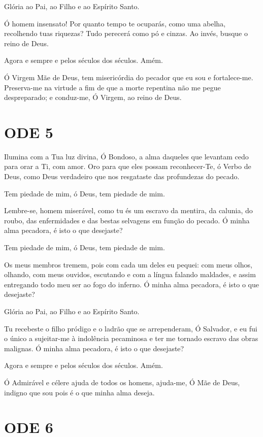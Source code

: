 \documentclass{subfiles}
\begin{document}
Glória ao Pai, ao Filho e ao Espírito Santo.

Ó homem insensato! Por quanto tempo te ocuparás, como uma abelha, recolhendo
tuas riquezas? Tudo perecerá como pó e cinzas. Ao invés, busque o reino de Deus.

Agora e sempre e pelos séculos dos séculos. Amém.

\theotokion{}Ó Virgem Mãe de Deus, tem misericórdia do pecador que eu sou
e fortalece-me. Preserva-me na virtude a fim de que a morte repentina não
me pegue despreparado; e conduz-me, Ó Virgem, ao reino de Deus.

\section{ODE 5}

\eirmos{}Ilumina com a Tua luz divina, Ó Bondoso, a alma daqueles que levantam
cedo para orar a Ti, com amor. Oro para que eles possam reconhecer-Te, ó
Verbo de Deus, como Deus verdadeiro que nos resgataste das profundezas do
pecado.

Tem piedade de mim, ó Deus, tem piedade de mim.

Lembre-se, homem miserável, como tu és um escravo da mentira, da
calunia, do roubo, das enfermidades e das bestas selvagens em função do
pecado. Ó minha alma pecadora, é isto o que desejaste?

Tem piedade de mim, ó Deus, tem piedade de mim.

Os meus membros tremem, pois com cada um deles eu pequei: com
meus olhos, olhando, com meus ouvidos, escutando e com a língua falando
maldades, e assim entregando todo meu ser ao fogo do inferno. Ó minha alma
pecadora, é isto o que desejaste?

Glória ao Pai, ao Filho e ao Espírito Santo.

Tu recebeste o filho pródigo e o ladrão que se arrependeram, Ó
Salvador, e eu fui o único a sujeitar-me à indolência pecaminosa e ter me
tornado escravo das obras malignas. Ó minha alma pecadora, é isto o que
desejaste?

Agora e sempre e pelos séculos dos séculos. Amém.

Ó Admirável e célere ajuda de todos os homens, ajuda-me, Ó Mãe de
Deus, indigno que sou pois é o que minha alma deseja.

\section{ODE 6}
\end{document}
